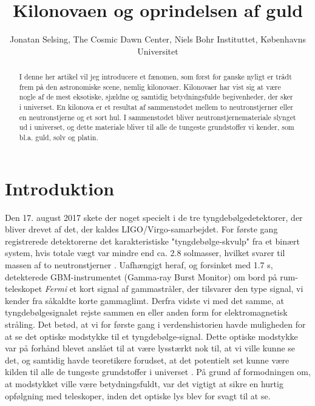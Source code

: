 \documentclass[twocolumn]{article}
\title{Kilonovaen og oprindelsen af guld}
\author{Jonatan Selsing, The Cosmic Dawn Center, Niels Bohr Instituttet, Københavns Universitet}
\date{\vspace{-3ex}}
\begin{document}
\maketitle


\begin{abstract}
I denne her artikel vil jeg introducere et fænomen, som først for ganske nyligt er trådt frem på den astronomiske scene, nemlig kilonovaer. Kilonovaer har vist sig at være nogle af de mest eksotiske, sjældne og samtidig betydningsfulde begivenheder, der sker i universet. En kilonova er et resultat af sammenstødet mellem to neutronstjerner eller en neutronstjerne og et sort hul. I sammenstødet bliver neutronstjernemateriale slynget ud i universet, og dette materiale bliver til alle de tungeste grundstoffer vi kender, som bl.a. guld, sølv og platin. 
\end{abstract}

\section{Introduktion}
Den 17. august 2017 skete der noget specielt i de tre tyngdebølgedetektorer, der bliver drevet af det, der kaldes LIGO/Virgo-samarbejdet. For første gang registrerede detektorerne det karakteristiske "tyngdebølge-skvulp" fra et binært system, hvis totale vægt var mindre end ca. 2.8 solmasser, hvilket svarer til massen af to neutronstjerner \cite{abbotta}. Uafhængigt heraf, og forsinket med 1.7 s, detekterede GBM-instrumentet (Gamma-ray Burst Monitor) om bord på rum-teleskopet \textit{Fermi} et kort signal af gammastråler, der tilsvarer den type signal, vi kender fra såkaldte korte gammaglimt. Derfra vidste vi med det samme, at tyngdebølgesignalet rejste sammen en eller anden form for elektromagnetisk stråling. Det betød, at vi for første gang i verdenshistorien havde muligheden for at se det optiske modstykke til et tyngdebølge-signal. Dette optiske modstykke var på forhånd blevet anslået til at være lysstærkt nok til, at vi ville kunne se det, og samtidig havde teoretikere forudset, at det potentielt set kunne være kilden til alle de tungeste grundstoffer i universet \cite{lattimer}. På grund af formodningen om, at modstykket ville være betydningsfuldt, var det vigtigt at sikre en hurtig opfølgning med teleskoper, inden det optiske lys blev for svagt til at se. 
\end{document}
